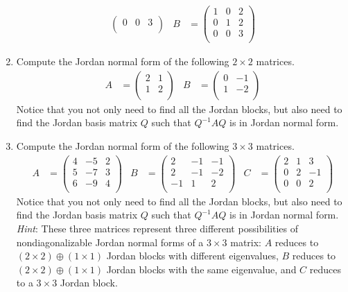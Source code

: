 \documentclass[../psets.tex]{subfiles}
\begin{document}
\begin{enumerate}
\begin{align*}
\begin{pmatrix}
            0 & 0 & 3\\
        \end{pmatrix}&
        B &=
        \begin{pmatrix}
            1 & 0 & 2\\
            0 & 1 & 2\\
            0 & 0 & 3\\
        \end{pmatrix}
    \end{align*}
    \item Compute the Jordan normal form of the following $2\times 2$ matrices.
    \begin{align*}
        A &=
        \begin{pmatrix}
            2 & 1\\
            1 & 2\\
        \end{pmatrix}&
        B &=
        \begin{pmatrix}
            0 & -1\\
            1 & -2\\
        \end{pmatrix}
    \end{align*}
    Notice that you not only need to find all the Jordan blocks, but also need to find the Jordan basis matrix $Q$ such that $Q^{-1}AQ$ is in Jordan normal form.
    \setcounter{enumi}{9}
    \item Compute the Jordan normal form of the following $3\times 3$ matrices.
    \begin{align*}
        A &=
        \begin{pmatrix}
            4 & -5 & 2\\
            5 & -7 & 3\\
            6 & -9 & 4\\
        \end{pmatrix}&
        B &=
        \begin{pmatrix}
            2 & -1 & -1\\
            2 & -1 & -2\\
            -1 & 1 & 2\\
        \end{pmatrix}&
        C &=
        \begin{pmatrix}
            2 & 1 & 3\\
            0 & 2 & -1\\
            0 & 0 & 2\\
        \end{pmatrix}
    \end{align*}
    Notice that you not only need to find all the Jordan blocks, but also need to find the Jordan basis matrix $Q$ such that $Q^{-1}AQ$ is in Jordan normal form. \emph{Hint}: These three matrices represent three different possibilities of nondiagonalizable Jordan normal forms of a $3\times 3$ matrix: $A$ reduces to $(2\times 2)\oplus(1\times 1)$ Jordan blocks with different eigenvalues, $B$ reduces to $(2\times 2)\oplus(1\times 1)$ Jordan blocks with the same eigenvalue, and $C$ reduces to a $3\times 3$ Jordan block.
\end{enumerate}
\end{document}
